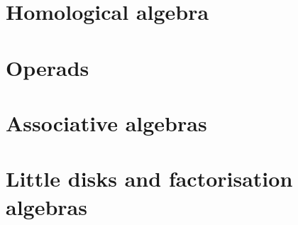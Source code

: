 \documentclass{article}
\begin{document}
\section{Homological algebra}



\section{Operads}

\nyw

\section{Associative algebras}

\nyw

\section{Little disks and factorisation algebras}

\nyw


\end{document}

